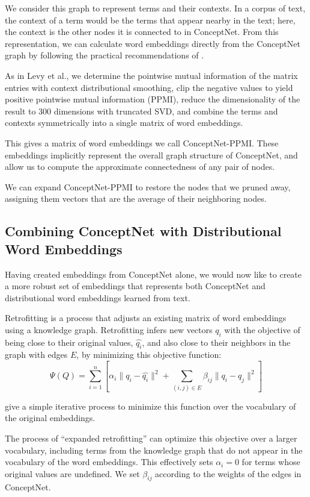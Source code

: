 \documentclass[letterpaper]{article}
\begin{document}
We consider this graph to represent terms and their contexts. In a corpus of
text, the context of a term would be the terms that appear nearby in the text;
here, the context is the other nodes it is connected to in ConceptNet. From
this representation, we can calculate word embeddings directly from the
ConceptNet graph by following the practical recommendations of
\citeauthor{levy2015embeddings} .

As in Levy et al., we determine the pointwise mutual information of the matrix
entries with context distributional smoothing, clip the negative values to
yield positive pointwise mutual information (PPMI), reduce the dimensionality
of the result to 300 dimensions with truncated SVD, and combine the terms and contexts
symmetrically into a single matrix of word embeddings.

This gives a matrix of word embeddings we call ConceptNet-PPMI.  These
embeddings implicitly represent the overall graph structure of ConceptNet, and
allow us to compute the approximate connectedness of any pair of nodes.

We can expand ConceptNet-PPMI to restore the nodes that we pruned away,
assigning them vectors that are the average of their neighboring nodes.

\subsection{Combining ConceptNet with Distributional Word Embeddings}

Having created embeddings from ConceptNet alone, we would now like to create
a more robust set of embeddings that represents both ConceptNet and distributional
word embeddings learned from text.

Retrofitting \cite{faruqui2015retrofitting} is a process that adjusts an
existing matrix of word embeddings using a knowledge graph. Retrofitting
infers new vectors $q_i$ with the objective of being close to their original
values, $\hat{q_i}$, and also close to their neighbors in the graph with edges $E$,
by minimizing this objective function:
$$\Psi(Q) = \sum_{i=1}^{n}\left[
    \alpha_i \lVert q_i - \hat{q_i} \rVert ^2 + \sum_{(i, j) \in E} \beta_{ij} \lVert q_i - q_j \rVert ^2
\right] $$

\citeauthor{faruqui2015retrofitting} give a simple iterative process to minimize
this function over the vocabulary of the original embeddings.

The process of ``expanded retrofitting'' \cite{speer2016ensemble} can optimize
this objective over a larger vocabulary, including terms from the knowledge
graph that do not appear in the vocabulary of the word embeddings. This
effectively sets $\alpha_i = 0$ for terms whose original values are undefined.
We set $\beta_{ij}$ according to the weights of the edges in ConceptNet.
\end{document}
